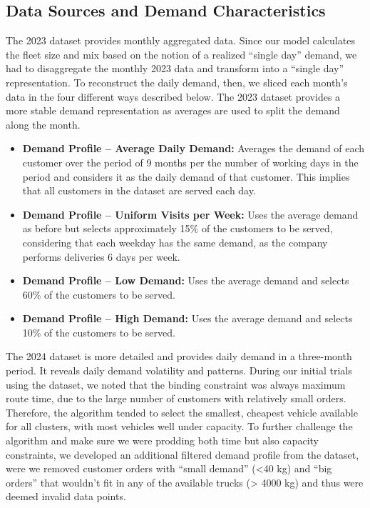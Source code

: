 \subsection{Data Sources and Demand Characteristics} 
\label{app:data:sources-demand}

The 2023 dataset provides monthly aggregated data. Since our model calculates the fleet size and mix based on the notion of a realized “single day” demand, we had to disaggregate the monthly 2023 data and transform into a “single day” representation. To reconstruct the daily demand, then, we sliced each month’s data in the four different ways described below. The 2023 dataset provides a more stable demand representation as averages are used to split the demand along the month.

\begin{itemize}
  \item \textbf{Demand Profile -- Average Daily Demand:} 
    Averages the demand of each customer over the period of 9 months per the number of working days in the period and considers it as the daily demand of that customer. This implies that all customers in the dataset are served each day.

  \item \textbf{Demand Profile -- Uniform Visits per Week:} 
    Uses the average demand as before but selects approximately 15\% of the customers to be served, considering that each weekday has the same demand, as the company performs deliveries 6 days per week. 

  \item \textbf{Demand Profile -- Low Demand:} 
    Uses the average demand and selects 60\% of the customers to be served.

  \item \textbf{Demand Profile -- High Demand:} 
    Uses the average demand and selects 10\% of the customers to be served.
\end{itemize}

The 2024 dataset is more detailed and provides daily demand in a three-month period. It reveals daily demand volatility and patterns. During our initial trials using the dataset, we noted that the binding constraint was always maximum route time, due to the large number of customers with relatively small orders. Therefore, the algorithm tended to select the smallest, cheapest vehicle available for all clusters, with most vehicles well under capacity. To further challenge the algorithm and make sure we were prodding both time but also capacity constraints, we developed an additional filtered demand profile from the dataset, were we removed customer orders with “small demand” (<40 kg) and “big orders” that wouldn’t fit in any of the available trucks (> 4000 kg) and thus were deemed invalid data points.

